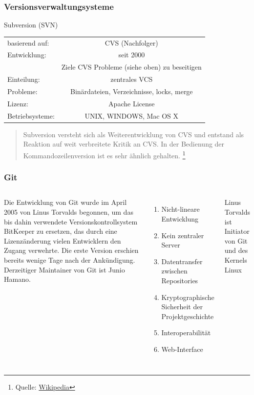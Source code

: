 \documentclass{beamer}
\begin{document}
\begin{frame}\frametitle{Versionsverwaltungsysteme} 
\begin{block}{Subversion (SVN)}
	\begin{tabular}{l c}
basierend auf: & CVS (Nachfolger) \\ 
Entwicklung: & seit 2000  \\  
 & Ziele CVS Probleme (siehe oben) zu beseitigen \\
Einteilung: & zentrales VCS \\ 
Probleme: & Binärdateien, Verzeichnisse, locks, merge \\
Lizenz: & Apache License \\
Betriebsysteme: & UNIX, WINDOWS, Mac OS X \\
\end{tabular} 
\begin{quote}
Subversion versteht sich als Weiterentwicklung von CVS und entstand als Reaktion auf weit verbreitete Kritik an CVS. In der Bedienung der Kommandozeilenversion ist es sehr ähnlich gehalten.  \footnote{Quelle: \href{http://de.wikipedia.org/wiki/Subversion_\%28Software\%29}{Wikipedia}}
\end{quote}
\end{block}
\end{frame}

\begin{frame}\frametitle{Git}
\begin{columns}
        {\small Die Entwicklung von Git wurde im April 2005 von Linus Torvalds begonnen, um das bis dahin verwendete Versionskontrollsystem BitKeeper zu ersetzen, das durch eine Lizenzänderung vielen Entwicklern den Zugang verwehrte. Die erste Version erschien bereits wenige Tage nach der Ankündigung. Derzeitiger Maintainer von Git ist Junio Hamano.}
                \begin{enumerate}
                \item Nicht-lineare Entwicklung
                \item Kein zentraler Server
                \item Datentransfer zwischen Repositories
                \item Kryptographische Sicherheit der Projektgeschichte
                \item Interoperabilität
				\item Web-Interface
                \end{enumerate}
                
{\tiny Linus Torvalds ist Initiator von Git und des Kernels Linux}
\end{columns}
\end{frame}
\end{document}
